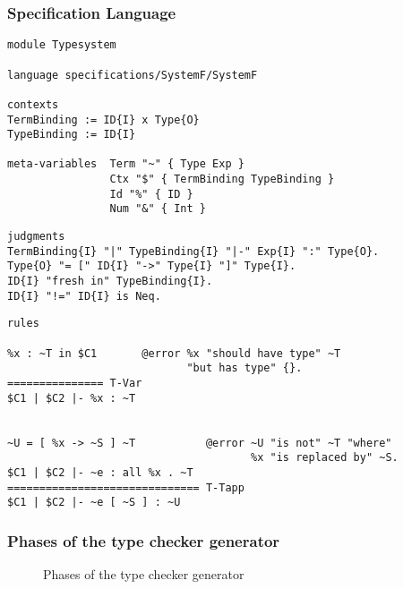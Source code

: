 \documentclass{beamer}
\begin{document}
\begin{frame}
  \frametitle{Specification Language}
\begin{lstlisting}
module Typesystem

language specifications/SystemF/SystemF

contexts
TermBinding := ID{I} x Type{O}
TypeBinding := ID{I}

meta-variables 	Term "~" { Type Exp }
                Ctx "$" { TermBinding TypeBinding }
                Id "%" { ID }
                Num "&" { Int }
\end{lstlisting}
\framebreak{}
\begin{lstlisting}
judgments
TermBinding{I} "|" TypeBinding{I} "|-" Exp{I} ":" Type{O}.
Type{O} "= [" ID{I} "->" Type{I} "]" Type{I}.
ID{I} "fresh in" TypeBinding{I}.
ID{I} "!=" ID{I} is Neq.
\end{lstlisting}
\framebreak{}
\small
\begin{lstlisting}
rules

%x : ~T in $C1       @error %x "should have type" ~T
                            "but has type" {}.
=============== T-Var
$C1 | $C2 |- %x : ~T


~U = [ %x -> ~S ] ~T           @error ~U "is not" ~T "where"
                                      %x "is replaced by" ~S.
$C1 | $C2 |- ~e : all %x . ~T
============================== T-Tapp
$C1 | $C2 |- ~e [ ~S ] : ~U
\end{lstlisting}
\end{frame}

\newcommand*\selectTemplateGeneration{}
\newcommand*\selectTemplateOptimization{}
\newcommand*\selectConstraintGeneration{}
\newcommand*\selectConstraintSolving{}
\begin{frame}[label=overview]
  \frametitle{Phases of the type checker generator}
\begin{figure}
\caption{Phases of the type checker generator}
\label{fig:phases}
\end{figure}
\end{frame}
\end{document}
